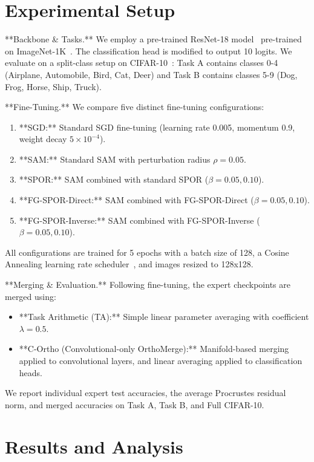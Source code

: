 \documentclass{article}
\theoremstyle{plain}
\theoremstyle{definition}
\theoremstyle{remark}
\begin{document}
\section{Experimental Setup}
\label{submission-experimental-setup}
**Backbone \& Tasks.** We employ a pre-trained ResNet-18 model~\cite{he2016deep} pre-trained on ImageNet-1K~\cite{deng2009imagenet}. The classification head is modified to output 10 logits. We evaluate on a split-class setup on CIFAR-10~\cite{krizhevsky2009learning}: Task A contains classes 0-4 (Airplane, Automobile, Bird, Cat, Deer) and Task B contains classes 5-9 (Dog, Frog, Horse, Ship, Truck).

**Fine-Tuning.** We compare five distinct fine-tuning configurations:
\begin{enumerate}
    \item **SGD:** Standard SGD fine-tuning (learning rate 0.005, momentum 0.9, weight decay $5 \times 10^{-4}$).
    \item **SAM:** Standard SAM with perturbation radius $\rho = 0.05$.
    \item **SPOR:** SAM combined with standard SPOR ($\beta = 0.05, 0.10$).
    \item **FG-SPOR-Direct:** SAM combined with FG-SPOR-Direct ($\beta = 0.05, 0.10$).
    \item **FG-SPOR-Inverse:** SAM combined with FG-SPOR-Inverse ($\beta = 0.05, 0.10$).
\end{enumerate}
All configurations are trained for 5 epochs with a batch size of 128, a Cosine Annealing learning rate scheduler~\cite{loshchilov2017decoupled}, and images resized to 128x128.

**Merging \& Evaluation.** Following fine-tuning, the expert checkpoints are merged using:
\begin{itemize}
    \item **Task Arithmetic (TA):** Simple linear parameter averaging with coefficient $\lambda = 0.5$.
    \item **C-Ortho (Convolutional-only OrthoMerge):** Manifold-based merging applied to convolutional layers, and linear averaging applied to classification heads.
\end{itemize}
We report individual expert test accuracies, the average Procrustes residual norm, and merged accuracies on Task A, Task B, and Full CIFAR-10.

\section{Results and Analysis}
\label{submission-results}
\end{document}

